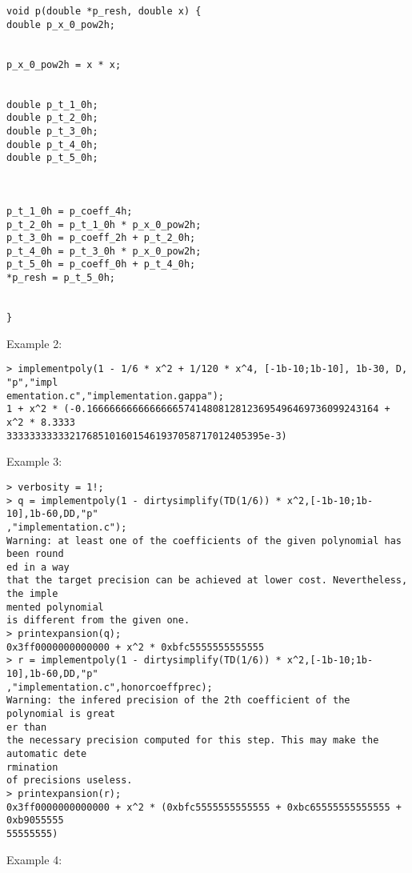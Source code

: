 \begin{center}
\begin{minipage}{15cm}
\begin{Verbatim}[frame=single]
void p(double *p_resh, double x) {
double p_x_0_pow2h;


p_x_0_pow2h = x * x;


double p_t_1_0h;
double p_t_2_0h;
double p_t_3_0h;
double p_t_4_0h;
double p_t_5_0h;
 


p_t_1_0h = p_coeff_4h;
p_t_2_0h = p_t_1_0h * p_x_0_pow2h;
p_t_3_0h = p_coeff_2h + p_t_2_0h;
p_t_4_0h = p_t_3_0h * p_x_0_pow2h;
p_t_5_0h = p_coeff_0h + p_t_4_0h;
*p_resh = p_t_5_0h;


}

\end{Verbatim}
\end{minipage}\end{center}
\noindent Example 2: 
\begin{center}\begin{minipage}{15cm}\begin{Verbatim}[frame=single]
> implementpoly(1 - 1/6 * x^2 + 1/120 * x^4, [-1b-10;1b-10], 1b-30, D, "p","impl
ementation.c","implementation.gappa");
1 + x^2 * (-0.166666666666666657414808128123695496469736099243164 + x^2 * 8.3333
333333333332176851016015461937058717012405395e-3)
\end{Verbatim}
\end{minipage}\end{center}
\noindent Example 3: 
\begin{center}\begin{minipage}{15cm}\begin{Verbatim}[frame=single]
> verbosity = 1!;
> q = implementpoly(1 - dirtysimplify(TD(1/6)) * x^2,[-1b-10;1b-10],1b-60,DD,"p"
,"implementation.c");
Warning: at least one of the coefficients of the given polynomial has been round
ed in a way
that the target precision can be achieved at lower cost. Nevertheless, the imple
mented polynomial
is different from the given one.
> printexpansion(q);
0x3ff0000000000000 + x^2 * 0xbfc5555555555555
> r = implementpoly(1 - dirtysimplify(TD(1/6)) * x^2,[-1b-10;1b-10],1b-60,DD,"p"
,"implementation.c",honorcoeffprec);
Warning: the infered precision of the 2th coefficient of the polynomial is great
er than
the necessary precision computed for this step. This may make the automatic dete
rmination
of precisions useless.
> printexpansion(r);
0x3ff0000000000000 + x^2 * (0xbfc5555555555555 + 0xbc65555555555555 + 0xb9055555
55555555)
\end{Verbatim}
\end{minipage}\end{center}
\noindent Example 4: 
